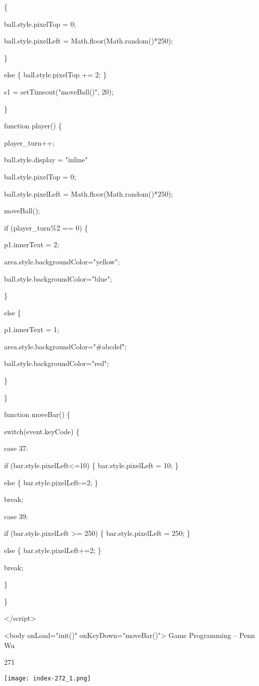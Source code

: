 \documentclass[
]{article}
\begin{document}
\{

ball.style.pixelTop = 0;

ball.style.pixelLeft = Math.floor(Math.random()*250);

\}

else \{ ball.style.pixelTop += 2; \}

s1 = setTimeout("moveBall()", 20);

\}

function player() \{

player\_turn++;

ball.style.display = "inline"

ball.style.pixelTop = 0;

ball.style.pixelLeft = Math.floor(Math.random()*250);

moveBall();

if (player\_turn\%2 == 0) \{

p1.innerText = 2;

area.style.backgroundColor="yellow";

ball.style.backgroundColor="blue";

\}

else \{

p1.innerText = 1;

area.style.backgroundColor="\#abcdef";

ball.style.backgroundColor="red";

\}

\}

function moveBar() \{

switch(event.keyCode) \{

case 37:

if (bar.style.pixelLeft\textless=10) \{ bar.style.pixelLeft = 10; \}

else \{ bar.style.pixelLeft-=2; \}

break;

case 39:

if (bar.style.pixelLeft \textgreater= 250) \{ bar.style.pixelLeft = 250;
\}

else \{ bar.style.pixelLeft+=2; \}

break;

\}

\}

\textless/script\textgreater{}

\textless body onLoad="init()" onKeyDown="moveBar()"\textgreater{} Game
Programming -- Penn Wu

271

\protect\hypertarget{index_split_014.htmlux5cux23p272}{}{}\texttt{[image: index-272\_1.png]}
\end{document}
